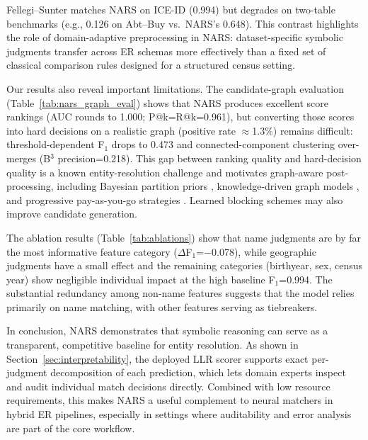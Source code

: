\documentclass{article}
\begin{document}
Fellegi--Sunter matches NARS on ICE-ID (0.994) but degrades on two-table benchmarks (e.g., 0.126 on Abt--Buy vs.\ NARS's 0.648). This contrast highlights the role of domain-adaptive preprocessing in NARS: dataset-specific symbolic judgments transfer across ER schemas more effectively than a fixed set of classical comparison rules designed for a structured census setting.

Our results also reveal important limitations. The candidate-graph evaluation (Table~\ref{tab:nars_graph_eval}) shows that NARS produces excellent score rankings (AUC rounds to 1.000; P@k=R@k=0.961), but converting those scores into hard decisions on a realistic graph (positive rate $\approx$1.3\%) remains difficult: threshold-dependent F$_1$ drops to 0.473 and connected-component clustering over-merges (B$^3$ precision=0.218). This gap between ranking quality and hard-decision quality is a known entity-resolution challenge \cite{Christen2012ASO} and motivates graph-aware post-processing, including Bayesian partition priors \cite{marchant2023bayesian}, knowledge-driven graph models \cite{hu2025grapher}, and progressive pay-as-you-go strategies \cite{payasyougo}. Learned blocking schemes \cite{Michelson2006LearningBS} may also improve candidate generation.

The ablation results (Table~\ref{tab:ablations}) show that name judgments are by far the most informative feature category ($\Delta$F$_1$=$-$0.078), while geographic judgments have a small effect and the remaining categories (birthyear, sex, census year) show negligible individual impact at the high baseline F$_1$=0.994. The substantial redundancy among non-name features suggests that the model relies primarily on name matching, with other features serving as tiebreakers.

In conclusion, NARS demonstrates that symbolic reasoning can serve as a transparent, competitive baseline for entity resolution. As shown in Section~\ref{sec:interpretability}, the deployed LLR scorer supports exact per-judgment decomposition of each prediction, which lets domain experts inspect and audit individual match decisions directly. Combined with low resource requirements, this makes NARS a useful complement to neural matchers in hybrid ER pipelines, especially in settings where auditability and error analysis are part of the core workflow.




\end{document}
